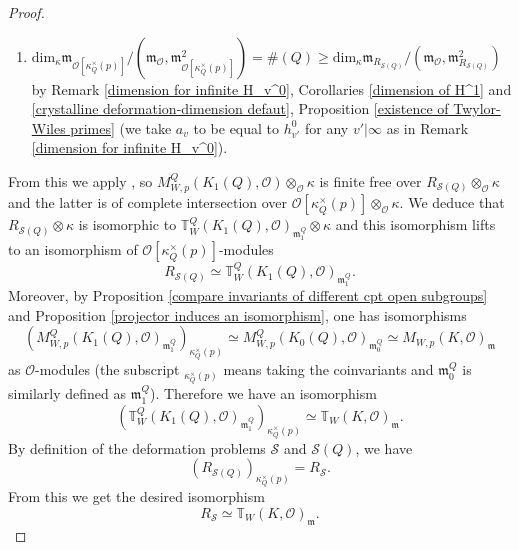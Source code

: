 \documentclass[12pt,oneside,reqno]{amsart}
\theoremstyle{plain}
\begin{document}
\begin{proof}
\begin{enumerate}
			
			\item 
			$\mathrm{dim}_\kappa
			\mathfrak{m}_{\mathcal{O}[\kappa_Q^\times(p)]}
			/
			\left(
			\mathfrak{m}_\mathcal{O},
			\mathfrak{m}_{\mathcal{O}[\kappa_Q^\times(p)]}^2
			\right)
			=
			\# (Q)
			\ge
			\mathrm{dim}_\kappa
			\mathfrak{m}_{R_{\mathcal{S}(Q)}}/
			\left(
			\mathfrak{m}_\mathcal{O},
			\mathfrak{m}_{R_{\mathcal{S}(Q)}}^2
			\right)
			$
			by
			Remark
			\ref{dimension for infinite H_v^0},
			Corollaries
			\ref{dimension of H^1}
			and
			\ref{crystalline deformation-dimension defaut},
			Proposition \ref{existence of Twylor-Wiles primes} (we take $a_v$ to be equal to $h_{v'}^0$ for any $v'|\infty$ as in Remark \ref{dimension for infinite H_v^0}).
		\end{enumerate}
		From this we apply \cite[Theorem 1.1]{Brochard2017}, so	$M_{W,p}^Q(K_1(Q),\mathcal{O})\otimes_\mathcal{O}\kappa$ is finite free over
		$R_{\mathcal{S}(Q)}\otimes_\mathcal{O}\kappa$ and the latter is of complete intersection over $\mathcal{O}[\kappa_Q^\times(p)]\otimes_\mathcal{O}\kappa$.
		We deduce that $R_{\mathcal{S}(Q)}\otimes\kappa$ is isomorphic to
		$\mathbb{T}_W^{Q}
		(K_1(Q),\mathcal{O})_{\mathfrak{m}_1^Q}
		\otimes\kappa$
		and this isomorphism lifts to an isomorphism of
		$\mathcal{O}[\kappa_Q^\times(p)]$-modules
		\[
		R_{\mathcal{S}(Q)}
		\simeq
		\mathbb{T}_W^{Q}(K_1(Q),\mathcal{O})_{\mathfrak{m}_1^Q}.
		\]
		Moreover, by Proposition \ref{compare invariants of different cpt open subgroups}
		and	Proposition	\ref{projector induces an isomorphism},	one has isomorphisms
		\[
		\left(
		M_{W,p}^Q(K_1(Q),\mathcal{O})_{\mathfrak{m}_1^Q}
		\right)_{\kappa_Q^\times(p)}
		\simeq
		M_{W,p}^Q
		(K_0(Q),\mathcal{O})_{\mathfrak{m}_0^Q}
		\simeq
		M_{W,p}(K,\mathcal{O})_{\mathfrak{m}}
		\]
		as $\mathcal{O}$-modules
		(the subscript
		$_{\kappa_Q^\times(p)}$
		means taking the coinvariants
		and $\mathfrak{m}_0^Q$
		is similarly defined as $\mathfrak{m}_1^Q$).
		Therefore
		we have an isomorphism
		\[
		\left(
		\mathbb{T}_W^{Q}(K_1(Q),\mathcal{O})_{\mathfrak{m}_1^Q}
		\right)_{\kappa_Q^\times(p)}
		\simeq
		\mathbb{T}_W(K,\mathcal{O})_{\mathfrak{m}}.
		\]
		By definition of the deformation problems
		$\mathcal{S}$ and $\mathcal{S}(Q)$, we have
		\[
		(R_{\mathcal{S}(Q)})_{\kappa_Q^\times(p)}
		=
		R_{\mathcal{S}}.
		\]
		From this we get the desired isomorphism
		\[
		R_\mathcal{S}
		\simeq
		\mathbb{T}_W(K,\mathcal{O})_\mathfrak{m}.
		\]
	\end{proof}
	
	
	
\end{document}
